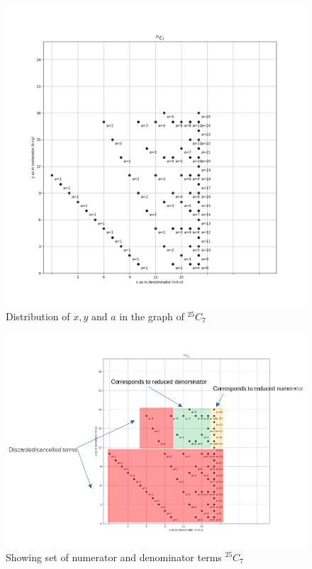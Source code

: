 \documentclass[10pt, twoside]{article}
\newcommand*{\Combination}[2]{{}^{#1}C_{#2}}%
\begin{document}
\begin{appendices}
\begin{figure}[ph!]
\includegraphics[width=\linewidth]{25_7_alone.png}
\caption{Distribution of $x,y \text{ and } a$ in the graph of $\Combination{25}{7}$}
\label{25_C_7_example}
\end{figure}
\begin{figure}[ph!]
\includegraphics[width=\linewidth]{CalculationOfCombination.png}
\caption{Showing set of numerator and denominator terms $\Combination{25}{7}$}
\label{CalculationOfCombination}
\end{figure}

\end{appendices}
\end{document}
